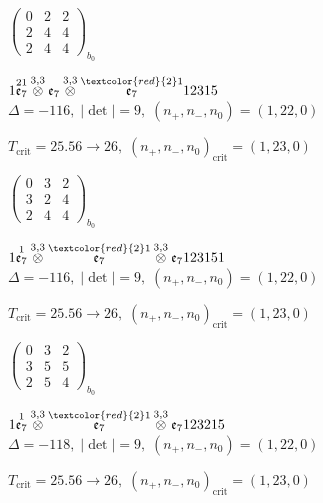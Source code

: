 \documentclass[10pt]{article}
\begin{document}
\hspace{2em}$\left(\begin{smallmatrix}0 & 2 & 2 \\ 2 & 4 & 4 \\ 2 & 4 & 4\end{smallmatrix}\right)_{\!b_0}$

$1\overset{21}{\mathfrak{e}_7}\overset{3,3}{\otimes}\mathfrak{e}_7\overset{3,3}{\otimes}\overset{\textcolor{red}{2}1}{\mathfrak{e}_7}12315$ \quad $\Delta=-116,\; |\det|=9,\; (n_+,n_-,n_0)=(1,22,0)$

\hspace{1em}$T_{\text{crit}}=25.56 \to 26,\; (n_+,n_-,n_0)_{\text{crit}}=(1,23,0)$

\hspace{2em}$\left(\begin{smallmatrix}0 & 3 & 2 \\ 3 & 2 & 4 \\ 2 & 4 & 4\end{smallmatrix}\right)_{\!b_0}$

\smallskip

$1\overset{1}{\mathfrak{e}_7}\overset{3,3}{\otimes}\overset{\textcolor{red}{2}1}{\mathfrak{e}_7}\overset{3,3}{\otimes}\mathfrak{e}_7123151$ \quad $\Delta=-116,\; |\det|=9,\; (n_+,n_-,n_0)=(1,22,0)$

\hspace{1em}$T_{\text{crit}}=25.56 \to 26,\; (n_+,n_-,n_0)_{\text{crit}}=(1,23,0)$

\hspace{2em}$\left(\begin{smallmatrix}0 & 3 & 2 \\ 3 & 5 & 5 \\ 2 & 5 & 4\end{smallmatrix}\right)_{\!b_0}$

\smallskip

$1\overset{1}{\mathfrak{e}_7}\overset{3,3}{\otimes}\overset{\textcolor{red}{2}1}{\mathfrak{e}_7}\overset{3,3}{\otimes}\mathfrak{e}_7123215$ \quad $\Delta=-118,\; |\det|=9,\; (n_+,n_-,n_0)=(1,22,0)$

\hspace{1em}$T_{\text{crit}}=25.56 \to 26,\; (n_+,n_-,n_0)_{\text{crit}}=(1,23,0)$
\end{document}
